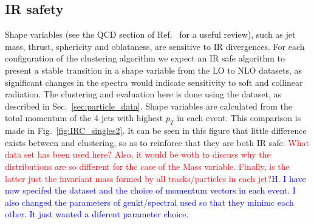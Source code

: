 \subsection{IR safety}
Shape variables (see the QCD section of Ref.~\cite{Altarelli:116932} for a useful review), such as jet mass, thrust, sphericity and oblataness,  are sensitive to IR divergences.
For each configuration of the clustering algorithm we expect an IR safe algorithm to present a stable transition
in a shape variable from the LO to NLO datasets, as significant
changes in the spectra would indicate sensitivity to soft and collinear radiation.
The clustering and evaluation here is done using the  dataset, as described in Sec.~\ref{sec:particle_data}.
Shape variables are calculated from the total momentum of the 4 jets with highest \(p_T\) in each event.
This comparison is made in Fig.~\ref{fig:IRC_singles2}.
It can be seen in this figure that little difference exists between \genkt{} and \spectral{} clustering, so as to reinforce that they are both IR safe.
{\textcolor{red}{What data set has been used here? Also, it would be woth to discuss why the distributions are so different for the case of the Mass variable. Finally, is the latter just the invariant mass formed by all tracks/particles in each jet?}\textcolor{blue}{H. I have now specifed the dataset and the choice of momentum vectors in each event. I also changed the parameters of genkt/spectral used so that they minimc each other. It just wanted a diferent parameter choice.}}

